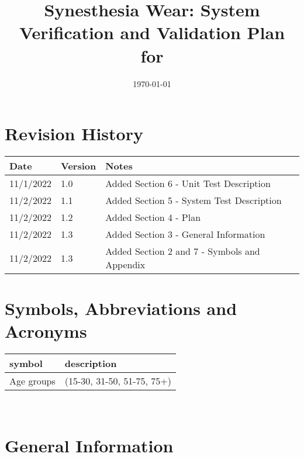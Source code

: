\documentclass[12pt, titlepage]{article}
\begin{document}
\title{Synesthesia Wear: System Verification and Validation Plan for \progname{}} 
\author{\authname}
\date{\today}
	
\maketitle


\section*{Revision History}

\begin{tabularx}{\textwidth}{p{3cm}p{2cm}X}
\toprule {\bf Date } & {\bf Version} & {\bf Notes}\\
\midrule
11/1/2022 & 1.0 & Added Section 6 - Unit Test Description\\
11/2/2022 & 1.1 & Added Section 5 - System Test Description\\
11/2/2022 & 1.2 & Added Section 4 - Plan\\
11/2/2022 & 1.3 & Added Section 3 - General Information\\
11/2/2022 & 1.3 & Added Section 2 and 7 - Symbols and Appendix\\
\bottomrule
\end{tabularx}

\newpage

\tableofcontents

\listoffigures

\listoftables

\newpage

\section*{Symbols, Abbreviations and Acronyms}

\renewcommand{\arraystretch}{1.2}
\begin{tabular}{l l} 
  \toprule		
  \textbf{symbol} & \textbf{description}\\
  \midrule 
  Age groups & (15-30, 31-50, 51-75, 75+)\\
  \bottomrule
\end{tabular}\\

\newpage


\section{General Information}
\end{document}
